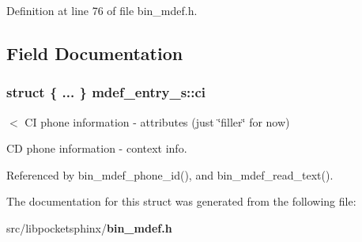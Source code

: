 \-Definition at line 76 of file bin\-\_\-mdef.\-h.



\subsection{\-Field \-Documentation}
\subsubsection[{ci}]{\setlength{\rightskip}{0pt plus 5cm}struct \{ ... \}   {\bf mdef\-\_\-entry\-\_\-s\-::ci}}\label{structmdef__entry__s_a24e5db7af5e705b310e82154055043ec}


$<$ \-C\-I phone information -\/ attributes (just \char`\"{}filler\char`\"{} for now) 

\-C\-D phone information -\/ context info. 

\-Referenced by bin\-\_\-mdef\-\_\-phone\-\_\-id(), and bin\-\_\-mdef\-\_\-read\-\_\-text().



\-The documentation for this struct was generated from the following file\-:\begin{DoxyCompactItemize}
\item 
src/libpocketsphinx/{\bf bin\-\_\-mdef.\-h}\end{DoxyCompactItemize}
